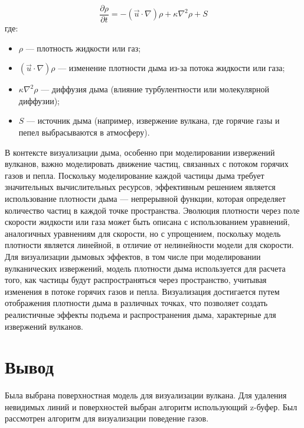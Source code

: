 \begin{equation}
	\label{eq:second_Navie_Stoks}
	\frac{\partial \rho}{\partial t} = -(\vec{u} \cdot \nabla) \rho + \kappa \nabla^2 \rho + S
\end{equation}
где:
\begin{itemize}
	\item \(\rho\) — плотность жидкости или газ;
	\item \((\vec{u} \cdot \nabla) \rho\) — изменение плотности дыма из-за потока жидкости или газа;
	\item \(\kappa \nabla^2 \rho\) — диффузия дыма (влияние турбулентности или молекулярной диффузии);
	\item \(S\) — источник дыма (например, извержение вулкана, где горячие газы и пепел выбрасываются в атмосферу).
\end{itemize}
	
В контексте визуализации дыма, особенно при моделировании извержений вулканов, важно моделировать движение частиц, связанных с потоком горячих газов и пепла. Поскольку моделирование каждой частицы дыма требует значительных вычислительных ресурсов, эффективным решением является использование плотности дыма — непрерывной функции, которая определяет количество частиц в каждой точке пространства. Эволюция плотности через поле скорости жидкости или газа может быть описана с использованием уравнений, аналогичных уравнениям для скорости, но с упрощением, поскольку модель плотности является линейной, в отличие от нелинейности модели для скорости. Для визуализации дымовых эффектов, в том числе при моделировании вулканических извержений, модель плотности дыма используется для расчета того, как частицы будут распространяться через пространство, учитывая изменения в потоке горячих газов и пепла. Визуализация достигается путем отображения плотности дыма в различных точках, что позволяет создать реалистичные эффекты подъема и распространения дыма, характерные для извержений вулканов. 

\section*{Вывод}
Была выбрана поверхностная модель для визуализации вулкана.
Для удаления невидимых линий и поверхностей выбран алгоритм использующий z-буфер. Был рассмотрен алгоритм для визуализации поведение газов.
